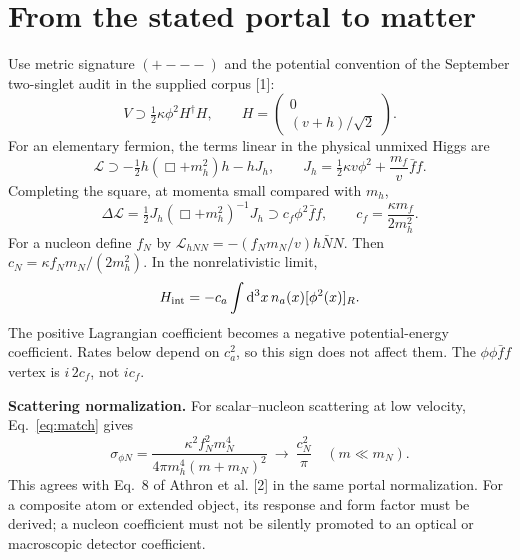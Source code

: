 \documentclass[11pt]{article}
\newcommand{\dd}{\mathrm{d}}
\begin{document}
\section{From the stated portal to matter}
Use metric signature $(+---)$ and the potential convention of the September
two-singlet audit in the supplied corpus [1]:
\begin{equation}
 V\supset \tfrac12\kappa\phi^2H^\dagger H,\qquad
 H=\begin{pmatrix}0\\(v+h)/\sqrt2\end{pmatrix}.
\end{equation}
For an elementary fermion, the terms linear in the physical unmixed Higgs are
\begin{equation}
 \mathcal L\supset-\tfrac12h(\Box+m_h^2)h-hJ_h,\qquad
 J_h=\tfrac12\kappa v\phi^2+\frac{m_f}{v}\bar f f.
\end{equation}
Completing the square, at momenta small compared with $m_h$,
\begin{equation}
 \Delta\mathcal L=\tfrac12J_h(\Box+m_h^2)^{-1}J_h
 \supset c_f\phi^2\bar f f,\qquad c_f=\frac{\kappa m_f}{2m_h^2}.
 \label{eq:match}
\end{equation}
For a nucleon define $f_N$ by
$\mathcal L_{hNN}=-(f_Nm_N/v)h\bar NN$. Then
$c_N=\kappa f_Nm_N/(2m_h^2)$. In the nonrelativistic limit,
\begin{equation}
 H_{\rm int}=-c_a\int\dd^3x\,n_a(x)[\phi^2(x)]_R.
 \label{eq:matter}
\end{equation}
The positive Lagrangian coefficient becomes a negative potential-energy
coefficient. Rates below depend on $c_a^2$, so this sign does not affect them.
The $\phi\phi\bar ff$ vertex is $i\,2c_f$, not $ic_f$.

\textbf{Scattering normalization.} For scalar--nucleon scattering at low
velocity, Eq.~\eqref{eq:match} gives
\begin{equation}
 \sigma_{\phi N}=\frac{\kappa^2 f_N^2m_N^4}
 {4\pi m_h^4(m+m_N)^2}
 \ \longrightarrow\ \frac{c_N^2}{\pi}\quad(m\ll m_N).
 \label{eq:sigma}
\end{equation}
This agrees with Eq.~8 of Athron et al. [2] in the same portal normalization.
For a composite atom or extended object, its response and form factor must
be derived; a nucleon coefficient must not be silently promoted to an optical
or macroscopic detector coefficient.
\end{document}
